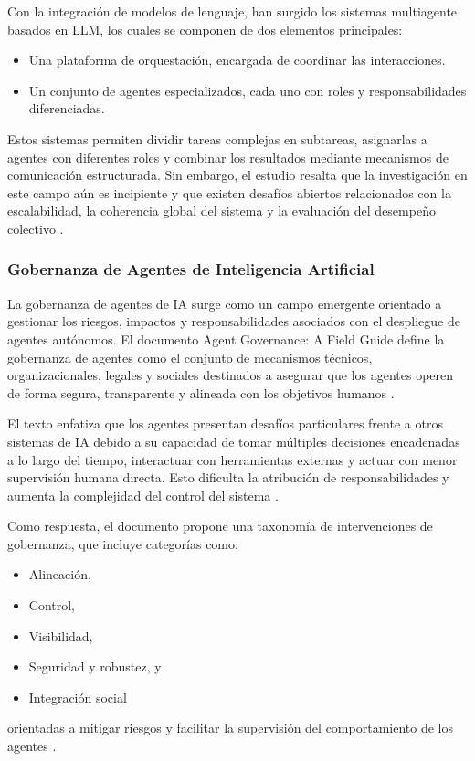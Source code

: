 Con la integración de modelos de lenguaje, han surgido los sistemas  multiagente
basados en LLM, los cuales se componen de dos elementos principales:

\begin{itemize}
      \item Una plataforma de orquestación, encargada de coordinar las
            interacciones.
      \item Un conjunto de agentes especializados, cada uno con roles y
            responsabilidades diferenciadas.
\end{itemize}

Estos sistemas permiten dividir tareas  complejas  en  subtareas,  asignarlas  a
agentes con diferentes roles y combinar los resultados  mediante  mecanismos  de
comunicación estructurada. Sin embargo, el estudio resalta que la  investigación
en este campo aún es incipiente y que existen desafíos abiertos relacionados con
la escalabilidad, la coherencia global del sistema y la evaluación del desempeño
colectivo \parencite[]{he2025llm}.

\subsubsection{Gobernanza de Agentes de Inteligencia Artificial}

La gobernanza de agentes de  IA  surge  como  un  campo  emergente  orientado  a
gestionar los riesgos, impactos y responsabilidades asociados con el  despliegue
de agentes autónomos. El documento Agent Governance: A  Field  Guide  define  la
gobernanza de agentes como el conjunto de mecanismos técnicos, organizacionales,
legales y sociales destinados a asegurar que los agentes operen de forma segura,
transparente      y      alineada      con      los      objetivos       humanos
\parencite[]{kraprayoon2025ai}.

El texto enfatiza que los agentes presentan desafíos particulares frente a otros
sistemas de IA debido a su capacidad de tomar múltiples decisiones encadenadas a
lo largo del tiempo, interactuar con herramientas externas y  actuar  con  menor
supervisión humana directa. Esto dificulta la atribución de responsabilidades  y
aumenta la complejidad del control del sistema \parencite[]{kraprayoon2025ai}.

Como  respuesta,  el  documento  propone  una  taxonomía  de  intervenciones  de
gobernanza, que incluye categorías como:

\begin{itemize}
      \item Alineación,
      \item Control,
      \item Visibilidad,
      \item Seguridad y robustez, y
      \item Integración social
\end{itemize} orientadas a  mitigar  riesgos  y  facilitar  la  supervisión  del
comportamiento de los agentes \parencite[]{kraprayoon2025ai}.


